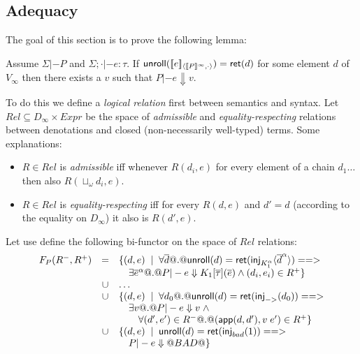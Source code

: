 \documentclass[preprint,nocopyrightspace,draft]{sigplanconf}
\begin{document}
\subsection{Adequacy}
The goal of this section is to prove the following lemma: 

\begin{theorem}
Assume $\Sigma |- P$ and $\Sigma;\cdot |- e : \tau$. 
If $\mathsf{unroll}([\![e]\!]_{\langle {[\![P]\!]^{\infty}},{\cdot}\rangle}) = \mathsf{ret}(d)$ for some 
element $d$ of $V_{\infty}$ then there exists a $v$ such 
that $P |- e \Downarrow v$.
\end{theorem}

To do this we define a {\em logical relation} first between semantics 
and syntax. Let $Rel \subseteq D_\infty \times Expr$ be the space of 
{\em admissible} and {\em equality-respecting} relations between 
denotations and closed (non-necessarily well-typed) terms. Some explanations:
\begin{itemize}
  \item $R \in Rel$ is {\em admissible} iff whenever 
  $R(d_i,e)$ for every element of a chain $d_1\ldots$ then also $R(\sqcup_{\omega}d_i,e)$. 
  \item $R \in Rel$ is {\em equality-respecting} iff for every 
  $R(d,e)$ and $d' = d$ (according to the equality on $D_{\infty}$) it also is
  $R(d',e)$. 
\end{itemize}

Let use define the following bi-functor on the space of $Rel$ relations:
{\setlength{\arraycolsep}{2pt}
\[\begin{array}{lcl}
   F_{P}(R^{-},R^{+}) & = & \{ (d,e)\;\mid\;\forall \overline{d} @.@ \mathsf{unroll}(d) = \mathsf{ret}(\mathsf{inj}_{K_1^\alpha}\langle\overline{d}^{\alpha}\rangle) ==> \\
                   &   & \quad \exists \overline{e}^{\alpha} @.@ P |- e \Downarrow K_1[\overline{\tau}](\overline{e}) \land (d_i,e_i) \in R^{+} \} \\ 
                   & \cup & \ldots \\ 
                   & \cup & \{ (d,e)\;\mid\;\forall d_0 @.@ \mathsf{unroll}(d) = \mathsf{ret}(\mathsf{inj}_{->}(d_0)) ==> \\ 
                   &   & \quad \exists v @.@ P |- e \Downarrow v \;\land \\ 
                   &  & \quad\quad \forall (d',e') \in R^{-} @.@ (\mathsf{app}(d,d'),v\;e') \in R^{+} \}  \\
                   & \cup & \{ (d,e)\;\mid\; \mathsf{unroll}(d) = \mathsf{ret}(\mathsf{inj}_{bad}(1)) ==> \\ 
                   &   & \quad P |- e \Downarrow @BAD@ \} 
\end{array}\]}
\end{document}
